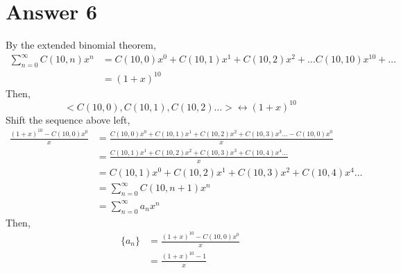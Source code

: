 \documentclass[12pt]{article}
\begin{document}
\section*{Answer 6}
By the extended binomial theorem,
\begin{align*} 
	\sum_{n=0}^{\infty} C(10, n)x^n & = C(10, 0)x^0 + C(10, 1)x^1 + C(10, 2)x^2 +\dots C(10, 10)x^{10}+\dots\\
								& = (1+x)^{10}
\end{align*}
Then,
\begin{equation*} 
	<C(10,0), C(10,1), C(10,2)\dots> \longleftrightarrow (1+x)^{10} 
\end{equation*}
Shift the sequence above left,\\
\begin{align*} 
	\frac{(1+x)^{10}-C(10,0)x^0}{x} & = \frac{C(10, 0)x^0 + C(10, 1)x^1 + C(10, 2)x^2 + C(10, 3)x^{3}\dots - C(10, 0)x^0}{x}\\
									& = \frac{C(10, 1)x^1 + C(10, 2)x^2 + C(10, 3)x^3 + C(10, 4)x^{4}\dots}{x}\\
									& = C(10, 1)x^0 + C(10, 2)x^1 +C(10, 3)x^2 + C(10, 4)x^4 \dots\\
									& = \sum_{n=0}^{\infty} C(10, n+1)x^n\\
									& = \sum_{n=0}^{\infty} a_{n}x^{n}
\end{align*}
Then,
\begin{align*}
	\{a_n\} & = \frac{(1+x)^{10}-C(10,0)x^0}{x}\\
		    & = \frac{(1+x)^{10}-1}{x}
\end{align*}
\end{document}
